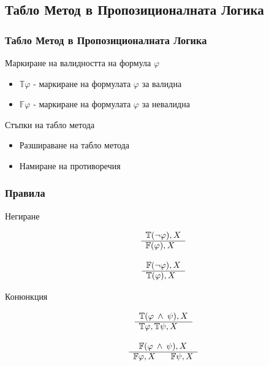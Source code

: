 \documentclass{beamer}
\newcommand{\signT}{\mathbb{T}}
\newcommand{\signF}{\mathbb{F}}
\begin{document}
\subsection{Табло Метод в Пропозиционалната Логика}
\begin{frame}\frametitle{Табло Метод в Пропозиционалната Логика}
Маркиране на валидността на формула $\varphi$
\begin{itemize}
	\item $\signT \varphi$ - маркиране на формулата $\varphi$ за валидна
	\item $\signF \varphi$ - маркиране на формулата $\varphi$ за невалидна
\end{itemize}
\vspace{20px}
Стъпки на табло метода
\begin{itemize}
	\item Разшираване на табло метода
	\item Намиране на противоречия
\end{itemize}
\end{frame}

\begin{frame}\frametitle{Правила}
Негиране
\vspace{20px}
		\noindent\begin{minipage}{.5\linewidth}
		\begin{align*}
			\begin{array}{rl}
				& \signT(\neg \varphi), X \\
				      \cline{2-2}
				      & \signF(\varphi), X
			\end{array}
		\end{align*}
		\end{minipage}%
		\begin{minipage}{.5\linewidth}
		\begin{align*}
			\begin{array}{rl}
				& \signF(\neg \varphi), X \\
			      \cline{2-2}
			      & \signT(\varphi), X
			\end{array}
		\end{align*}
		\end{minipage}
Конюнкция
		\noindent\begin{minipage}{.5\linewidth}
		\begin{align*}
			\begin{array}{rl}
				& \signT(\varphi \: \wedge \: \psi), X \\
			      \cline{2-2}
			      & \signT\varphi, \signT\psi, X
			\end{array}
		\end{align*}
		\end{minipage}%
		\begin{minipage}{.5\linewidth}
		\begin{align*}
			\begin{array}{rl}
				& \:\:\: \signF(\varphi \: \wedge \: \psi), X \\
			      \cline{2-2}
			      & \signF\varphi, X \:\:\:\:\:\:\:\: \signF\psi, X
			\end{array}
		\end{align*}
		\end{minipage}
\end{frame}
\end{document}

